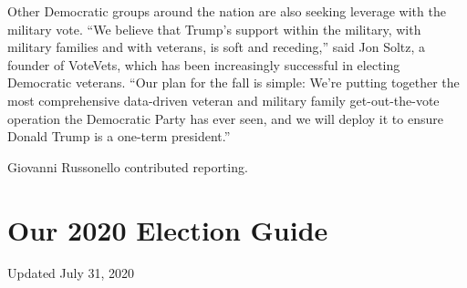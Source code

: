 Other Democratic groups around the nation are also seeking leverage with
the military vote. ``We believe that Trump's support within the
military, with military families and with veterans, is soft and
receding,'' said Jon Soltz, a founder of VoteVets, which has been
increasingly successful in electing Democratic veterans. ``Our plan for
the fall is simple: We're putting together the most comprehensive
data-driven veteran and military family get-out-the-vote operation the
Democratic Party has ever seen, and we will deploy it to ensure Donald
Trump is a one-term president.''

Giovanni Russonello contributed reporting.

\hypertarget{our-2020-election-guide}{%
\section{Our 2020 Election Guide}\label{our-2020-election-guide}}

Updated July 31, 2020

